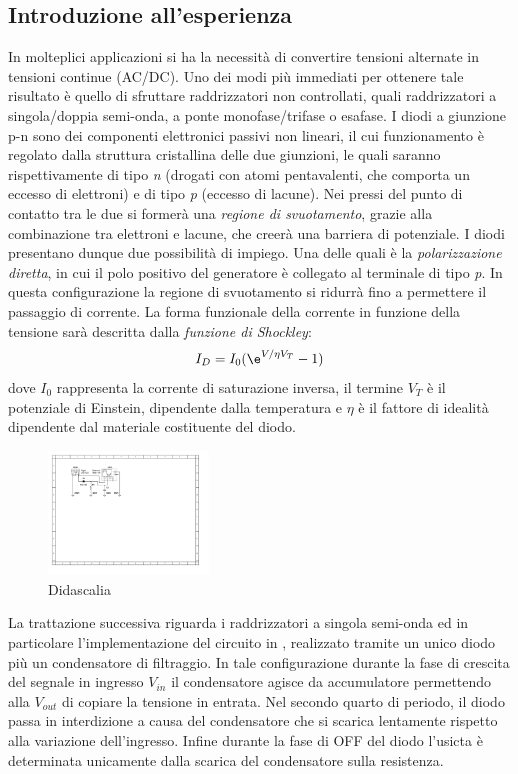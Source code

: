 \documentclass[journal]{IEEEtran}
\begin{document}
\subsection{\textbf{Introduzione all'esperienza}}
In molteplici applicazioni si ha la necessità di convertire tensioni alternate in tensioni continue (AC/DC). Uno dei modi più immediati per ottenere tale risultato è quello di sfruttare raddrizzatori non controllati, quali raddrizzatori a singola/doppia semi-onda, a ponte monofase/trifase o esafase.
I diodi a giunzione p-n sono dei componenti elettronici passivi non lineari, il cui funzionamento è regolato dalla struttura cristallina delle due giunzioni, le quali saranno rispettivamente di tipo \textit{n} (drogati con atomi pentavalenti, che comporta un eccesso di elettroni) e di tipo \textit{p} (eccesso di lacune). Nei pressi del punto di contatto tra le due si formerà una \textit{regione di svuotamento}, grazie alla combinazione tra elettroni e lacune, che creerà una barriera di potenziale. I diodi presentano dunque due possibilità di impiego. Una delle quali è la \textit{polarizzazione diretta}, in cui il polo positivo del generatore è collegato al terminale di
tipo \textit{p}. In questa configurazione la regione di svuotamento si ridurrà fino a permettere il passaggio di corrente. La forma funzionale della corrente in funzione della tensione sarà descritta dalla \textit{funzione di Shockley}:
\[I_D = I_0(\e^{V/\eta V_T}-1)\] 
dove $I_{0}$ rappresenta la corrente di saturazione inversa, il termine $V_{T}$ è il potenziale di Einstein, dipendente dalla temperatura e $\eta$ è il fattore di idealità dipendente dal materiale costituente del diodo.
\begin{figure}[H]%
\begin {center}
\includegraphics[width=0.38\textwidth]{sch-simulations/output/Diode-rectifier.pdf}
\caption{Didascalia}
\label{fig:oscilloscope}
\end {center}
\end{figure}
La trattazione successiva riguarda i raddrizzatori a singola semi-onda ed in particolare l'implementazione del circuito in , realizzato tramite un unico diodo più un condensatore di filtraggio. In tale configurazione durante la fase di crescita del segnale in ingresso $V_{in}$ il condensatore agisce da accumulatore permettendo alla $V_{out}$ di copiare la tensione in entrata. Nel secondo quarto di periodo, il diodo passa in interdizione a causa del condensatore che si scarica lentamente rispetto alla variazione dell'ingresso. Infine durante la fase di OFF del diodo l'usicta è determinata unicamente dalla scarica del condensatore sulla resistenza.
\end{document}
